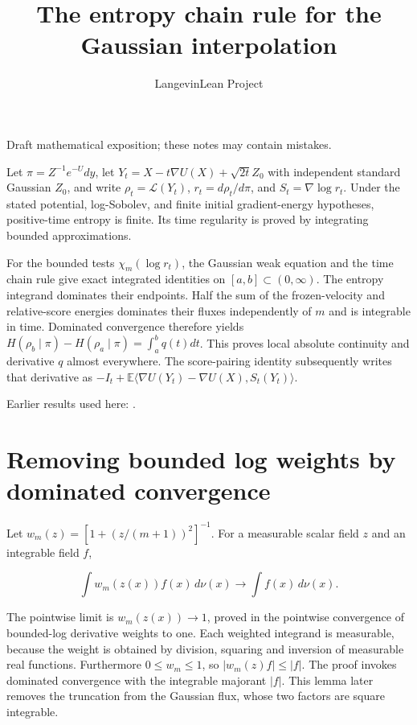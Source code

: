 \documentclass[11pt,a4paper]{article}
\title{\texorpdfstring{The entropy chain rule for the Gaussian interpolation}{The entropy chain rule for the Gaussian interpolation}}
\author{LangevinLean Project}
\date{}
\begin{document}
\maketitle
Draft mathematical exposition; these notes may contain mistakes.


Let \(\pi=Z^{-1}e^{-U}dy\), let \(Y_t=X-t\nabla U(X)+\sqrt{2t}Z_0\) with independent standard Gaussian \(Z_0\), and write \(\rho_t=\mathcal L(Y_t)\), \(r_t=d\rho_t/d\pi\), and \(S_t=\nabla\log r_t\). Under the stated potential, log-Sobolev, and finite initial gradient-energy hypotheses, positive-time entropy is finite. Its time regularity is proved by integrating bounded approximations.



For the bounded tests \(\chi_m(\log r_t)\), the Gaussian weak equation and the time chain rule give exact integrated identities on \([a,b]\subset(0,\infty)\). The entropy integrand dominates their endpoints. Half the sum of the frozen-velocity and relative-score energies dominates their fluxes independently of \(m\) and is integrable in time. Dominated convergence therefore yields \(H(\rho_b\mid\pi)-H(\rho_a\mid\pi)=\int_a^bq(t)dt\). This proves local absolute continuity and derivative \(q\) almost everywhere. The score-pairing identity subsequently writes that derivative as \(-I_t+\mathbb E\langle\nabla U(Y_t)-\nabla U(X),S_t(Y_t)\rangle\).



Earlier results used here: \cite[Section~3.46]{LangevinLean2026ULASC}.

\section{\texorpdfstring{Removing bounded log weights by dominated convergence}{Removing bounded log weights by dominated convergence}}


Let \(w_m(z)=[1+(z/(m+1))^2]^{-1}\). For a measurable scalar field \(z\) and an integrable field \(f\),

\[\int w_m(z(x))f(x)\,d\nu(x)\longrightarrow\int f(x)\,d\nu(x).\]

The pointwise limit is \(w_m(z(x))\to1\), proved in the pointwise convergence of bounded-log derivative weights to one. Each weighted integrand is measurable, because the weight is obtained by division, squaring and inversion of measurable real functions. Furthermore \(0\le w_m\le1\), so \(|w_m(z)f|\le|f|\). The proof invokes dominated convergence with the integrable majorant \(|f|\). This lemma later removes the truncation from the Gaussian flux, whose two factors are square integrable.
\end{document}
